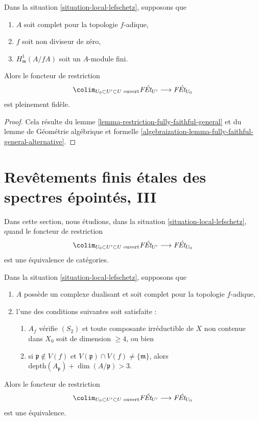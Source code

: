 \begin{lemma}
\label{lemma-fully-faithful-general}
Dans la situation \ref{situation-local-lefschetz}, supposons que
\begin{enumerate}
\item $A$ soit complet pour la topologie $f$-adique,
\item $f$ soit non diviseur de zéro,
\item $H^1_\mathfrak m(A/fA)$ soit un $A$-module fini.
\end{enumerate}
Alors le foncteur de restriction
$$
\colim_{U_0 \subset U' \subset U\text{ ouvert}} \textit{F\'Et}_{U'}
\longrightarrow
\textit{F\'Et}_{U_0}
$$
est pleinement fidèle.
\end{lemma}

\begin{proof}
Cela résulte du
lemme \ref{lemma-restriction-fully-faithful-general} et du
lemme de Géométrie algébrique et formelle
\ref{algebraization-lemma-fully-faithful-general-alternative}.
\end{proof}








\section{Revêtements finis étales des spectres épointés, III}
\label{section-pi1-punctured-spec-III}

\noindent
Dans cette section, nous étudions, dans la situation \ref{situation-local-lefschetz}, quand
le foncteur de restriction
$$
\colim_{U_0 \subset U' \subset U\text{ ouvert}} \textit{F\'Et}_{U'}
\longrightarrow
\textit{F\'Et}_{U_0}
$$
est une équivalence de catégories.

\begin{lemma}
\label{lemma-essentially-surjective-general-better}
Dans la situation \ref{situation-local-lefschetz}, supposons que
\begin{enumerate}
\item $A$ possède un complexe dualisant et soit complet pour la topologie $f$-adique,
\item l'une des conditions suivantes soit satisfaite :
\begin{enumerate}
\item $A_f$ vérifie $(S_2)$ et toute composante irréductible de $X$
non contenue dans $X_0$ soit de dimension $\geq 4$, ou bien
\item si $\mathfrak p \not \in V(f)$ et
$V(\mathfrak p) \cap V(f) \not = \{\mathfrak m\}$, alors
$\text{depth}(A_\mathfrak p) + \dim(A/\mathfrak p) > 3$.
\end{enumerate}
\end{enumerate}
Alors le foncteur de restriction
$$
\colim_{U_0 \subset U' \subset U\text{ ouvert}} \textit{F\'Et}_{U'}
\longrightarrow
\textit{F\'Et}_{U_0}
$$
est une équivalence.
\end{lemma}


